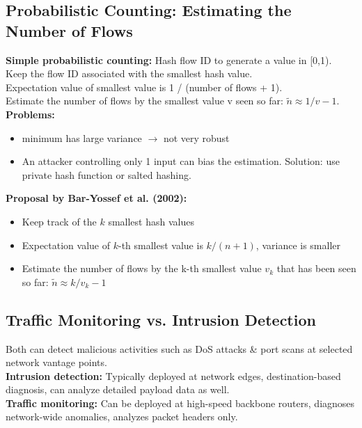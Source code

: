 \documentclass[11pt,oneside,a4paper]{article}
\begin{document}
\subsection{Probabilistic Counting: Estimating the Number of Flows}

\textbf{Simple probabilistic counting:} Hash flow ID to generate a value in [0,1). Keep the flow ID associated with the smallest hash value.\\
Expectation value of smallest value is 1 / (number of flows + 1).\\
Estimate the number of flows by the smallest value v seen so far: $\tilde{n} \approx 1/v - 1$.\\

\noindent \textbf{Problems:}
\vspace{-\topsep}
\begin{itemize}
	\setlength{\itemsep}{0pt}
	\setlength{\parskip}{0pt}
	\item minimum has large variance $\rightarrow$ not very robust
	\item An attacker controlling only 1 input can bias the estimation. Solution: use private hash function or salted hashing.
\end{itemize}
\vspace{-\topsep}

\noindent \textbf{Proposal by Bar-Yossef et al. (2002):}

\vspace{-\topsep}
\begin{itemize}
	\setlength{\itemsep}{0pt}
	\setlength{\parskip}{0pt}
	\item Keep track of the $k$ smallest hash values
	\item Expectation value of $k$-th smallest value is $k/(n+1)$, variance is smaller
	\item Estimate the number of flows by the k-th smallest value $v_k$ that has been seen
	so far: $\tilde{n} \approx k / v_k - 1$
\end{itemize}
\vspace{-\topsep}

\subsection{Traffic Monitoring vs. Intrusion Detection}

Both can detect malicious activities such as DoS attacks \& port scans at selected network
vantage points.\\
\textbf{Intrusion detection:} Typically deployed at network edges, destination-based diagnosis, can analyze detailed payload data as well.\\
\textbf{Traffic monitoring:} Can be deployed at high-speed backbone routers, diagnoses network-wide anomalies, analyzes packet headers only.
\end{document}

